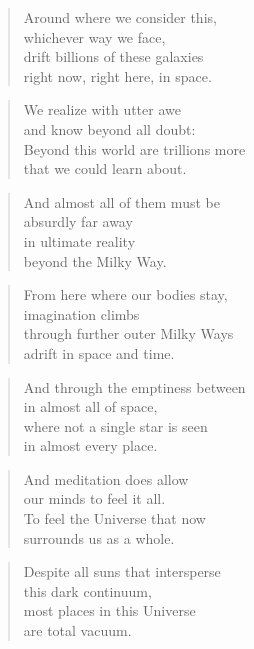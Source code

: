 \documentclass[10pt,a4paper]{article}
\begin{document}
\begin{multicols}{2}
\begin{verse}
Around where we consider this,\\
whichever way we face,\\
drift billions of these galaxies\\
right now, right here, in space.
\end{verse}

\begin{verse}
We realize with utter awe\\
and know beyond all doubt:\\
Beyond this world are trillions more\\
that we could learn about.
\end{verse}

\begin{verse}
And almost all of them must be\\
absurdly far away\\
in ultimate reality\\
beyond the Milky Way.
\end{verse}

\begin{verse}
From here where our bodies stay,\\
imagination climbs\\
through further outer Milky Ways\\
adrift in space and time.
\end{verse}

\begin{verse}
And through the emptiness between\\
in almost all of space,\\
where not a single star is seen\\
in almost every place.
\end{verse}

\begin{verse}
And meditation does allow\\
our minds to feel it all.\\
To feel the Universe that now\\
surrounds us as a whole.
\end{verse}

\begin{verse}
Despite all suns that intersperse\\
this dark continuum,\\
most places in this Universe\\
are total vacuum.
\end{verse}


\end{multicols}
\end{document}
